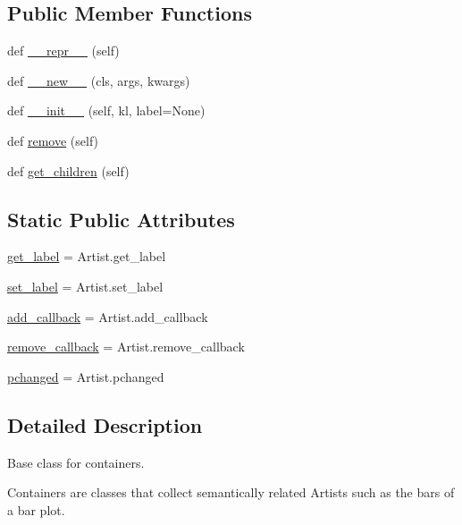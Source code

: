 \subsection*{Public Member Functions}
\begin{DoxyCompactItemize}
\item 
def \hyperlink{classmatplotlib_1_1container_1_1Container_a31b1afedee601645dfc89814a74f0f07}{\+\_\+\+\_\+repr\+\_\+\+\_\+} (self)
\item 
def \hyperlink{classmatplotlib_1_1container_1_1Container_acfea86c60c584976f93aecdb2b965c8f}{\+\_\+\+\_\+new\+\_\+\+\_\+} (cls, args, kwargs)
\item 
def \hyperlink{classmatplotlib_1_1container_1_1Container_a76fb4d96297447ba5413d10cc1638758}{\+\_\+\+\_\+init\+\_\+\+\_\+} (self, kl, label=None)
\item 
def \hyperlink{classmatplotlib_1_1container_1_1Container_ac62a97171f293a846c64d12e1011f912}{remove} (self)
\item 
def \hyperlink{classmatplotlib_1_1container_1_1Container_a1bc85c1ae51d5bd3f28176b3a5beb1b1}{get\+\_\+children} (self)
\end{DoxyCompactItemize}
\subsection*{Static Public Attributes}
\begin{DoxyCompactItemize}
\item 
\hyperlink{classmatplotlib_1_1container_1_1Container_aec88b06f57c29a63ef82688c65cb2125}{get\+\_\+label} = Artist.\+get\+\_\+label
\item 
\hyperlink{classmatplotlib_1_1container_1_1Container_aaf1a246057fd4721857a457e4268d1ea}{set\+\_\+label} = Artist.\+set\+\_\+label
\item 
\hyperlink{classmatplotlib_1_1container_1_1Container_ab2140ab71a17397772bc98ed19d2956f}{add\+\_\+callback} = Artist.\+add\+\_\+callback
\item 
\hyperlink{classmatplotlib_1_1container_1_1Container_adb0c3b4c2cfbff1232b83f9b3949043c}{remove\+\_\+callback} = Artist.\+remove\+\_\+callback
\item 
\hyperlink{classmatplotlib_1_1container_1_1Container_a34480b07903caca14d505eaa719e9fc1}{pchanged} = Artist.\+pchanged
\end{DoxyCompactItemize}


\subsection{Detailed Description}
\begin{DoxyVerb}Base class for containers.

Containers are classes that collect semantically related Artists such as
the bars of a bar plot.
\end{DoxyVerb}
 

